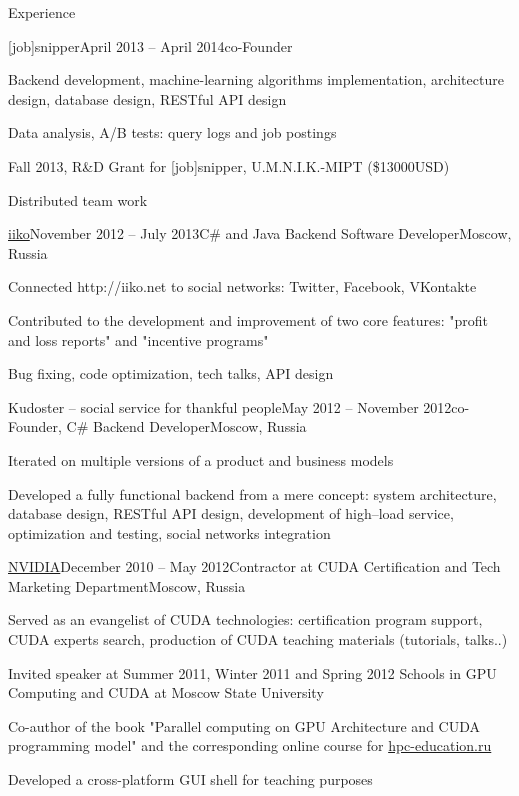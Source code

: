 \documentclass{resume} %
\begin{document}
\begin{rSection}{Experience}

\begin{rSubsection}{[job]snipper}{April 2013 -- April 2014}{co-Founder}{}
\item Backend development, machine-learning algorithms implementation, architecture design, database design, RESTful API design
\item Data analysis, A/B tests: query logs and job postings
\item Fall 2013, R\&D Grant for [job]snipper, U.M.N.I.K.-MIPT (\$13000USD)
\item Distributed team work
\end{rSubsection}


\begin{rSubsection}{\href{http://en.iiko.ru}{iiko}}{November 2012 -- July 2013}{C\# and Java Backend Software Developer}{Moscow, Russia}
\item Connected http://iiko.net to social networks: Twitter, Facebook, VKontakte
\item Contributed to the development and improvement of two core features: "profit and loss reports" and "incentive programs"
\item Bug fixing, code optimization, tech talks, API design
\end{rSubsection}


\begin{rSubsection}{Kudoster -- social service for thankful people}{May 2012 -- November 2012}{co-Founder, C\# Backend Developer}{Moscow, Russia}
\item Iterated on multiple versions of a product and business models
\item Developed a fully functional backend from a mere concept: system architecture, database design, RESTful API design, development of high–load service, optimization and testing, social networks integration
\end{rSubsection}


\begin{rSubsection}{\href{http://nvidia.ru}{NVIDIA}}{December 2010 -- May 2012}{Contractor at CUDA Certification and Tech Marketing Department}{Moscow, Russia}
\item Served as an evangelist of CUDA technologies: certification program support, CUDA experts search, production of CUDA teaching materials (tutorials, talks..)
\item Invited speaker at Summer 2011, Winter 2011 and Spring 2012 Schools in GPU Computing and CUDA at Moscow State University
\item Co-author of the book "Parallel computing on GPU Architecture and CUDA programming model" and the corresponding online course for \href{http://hpc-education.ru}{hpc-education.ru}
\item Developed a cross-platform GUI shell for teaching purposes
\end{rSubsection}


\end{rSection}
\end{document}
